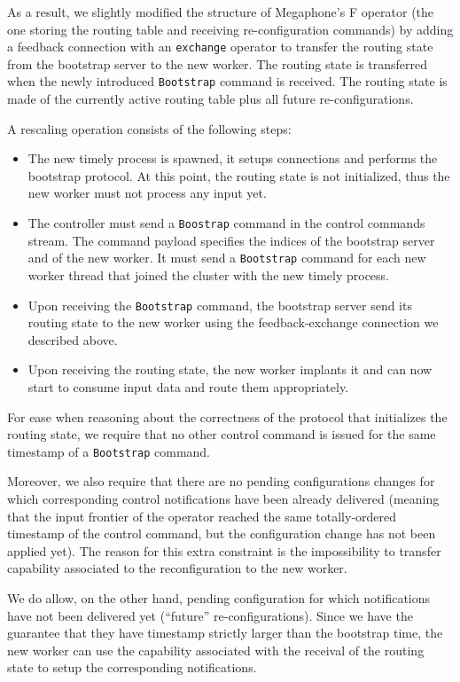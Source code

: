 \documentclass[12pt]{extarticle}
\begin{document}
As a result, we slightly modified the structure of Megaphone's F operator (the one storing the routing table
and receiving re-configuration commands) by adding a feedback connection with an \verb|exchange| operator
to transfer the routing state from the bootstrap server to the new worker. The routing state is transferred
when the newly introduced \verb|Bootstrap| command is received.
The routing state is made of the currently active routing table plus all future re-configurations.

A rescaling operation consists of the following steps:
\begin{itemize}
    \item The new timely process is spawned, it setups connections and performs the bootstrap protocol. At this
        point, the routing state is not initialized, thus the new worker must not process any input yet.
    \item The controller must send a \verb|Boostrap| command in the control commands stream. The command
        payload specifies the indices of the bootstrap server and of the new worker. It must send a \verb|Bootstrap| command
        for each new worker thread that joined the cluster with the new timely process.
    \item Upon receiving the \verb|Bootstrap| command, the bootstrap server send its routing state to the
        new worker using the feedback-exchange connection we described above.
    \item Upon receiving the routing state, the new worker implants it and can now start to consume input data
        and route them appropriately.
\end{itemize}

For ease when reasoning about the correctness of the protocol that initializes the routing state,
we require that no other control command is issued for the same timestamp of a \verb|Bootstrap| command.

Moreover, we also require that there are no pending configurations changes for which corresponding
control notifications have been already delivered (meaning that the input frontier of the operator reached the
same totally-ordered timestamp of the control command, but the configuration change has not been applied yet).
The reason for this extra constraint is the impossibility to transfer capability associated to the
reconfiguration to the new worker.

We do allow, on the other hand, pending configuration for which notifications have not been delivered yet (``future''
re-configurations). Since we have the guarantee that they have timestamp strictly larger than the bootstrap time,
the new worker can use the capability associated with the receival of the
routing state to setup the corresponding notifications.
\end{document}

